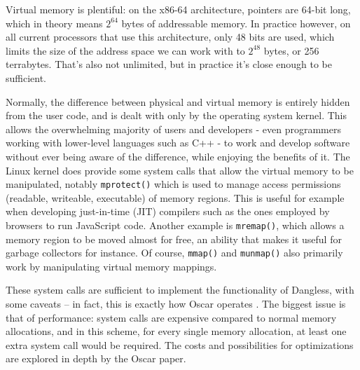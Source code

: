 Virtual memory is plentiful: on the x86-64 architecture, pointers are 64-bit long, which in theory means $2^{64}$ bytes of addressable memory. In practice however, on all current processors that use this architecture, only 48 bits are used, which limits the size of the address space we can work with to $2^{48}$ bytes, or 256 terrabytes. That's also not unlimited, but in practice it's close enough to be sufficient. 

Normally, the difference between physical and virtual memory is entirely hidden from the user code, and is dealt with only by the operating system kernel. This allows the overwhelming majority of users and developers - even programmers working with lower-level languages such as C++ - to work and develop software without ever being aware of the difference, while enjoying the benefits of it. The Linux kernel does provide some system calls that allow the virtual memory to be manipulated, notably \lstinline!mprotect()! which is used to manage access permissions (readable, writeable, executable) of memory regions. This is useful for example when developing just-in-time (JIT) compilers such as the ones employed by browsers to run JavaScript code. Another example is \lstinline!mremap()!, which allows a memory region to be moved almost for free, an ability that makes it useful for garbage collectors for instance. Of course,  \lstinline!mmap()! and \lstinline!munmap()! also primarily work by manipulating virtual memory mappings.

These system calls are sufficient to implement the functionality of Dangless, with some caveats -- in fact, this is exactly how Oscar operates . The biggest issue is that of performance: system calls are expensive compared to normal memory allocations, and in this scheme, for every single memory allocation, at least one extra system call would be required. The costs and possibilities for optimizations are explored in depth by the Oscar paper.


